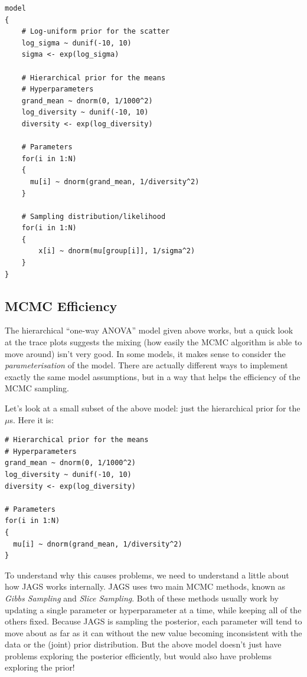 \begin{verbatim}
model
{
    # Log-uniform prior for the scatter
    log_sigma ~ dunif(-10, 10)
    sigma <- exp(log_sigma)

    # Hierarchical prior for the means
    # Hyperparameters
    grand_mean ~ dnorm(0, 1/1000^2)
    log_diversity ~ dunif(-10, 10)
    diversity <- exp(log_diversity)

    # Parameters
    for(i in 1:N)
    {
      mu[i] ~ dnorm(grand_mean, 1/diversity^2)
    }

    # Sampling distribution/likelihood
    for(i in 1:N)
    {
        x[i] ~ dnorm(mu[group[i]], 1/sigma^2)
    }
}
\end{verbatim}


\subsection{MCMC Efficiency}
The hierarchical ``one-way ANOVA'' model given above works, but a quick look
at the trace plots suggests the mixing (how easily the MCMC algorithm is
able to move around) isn't very good. In some models, it makes sense to
consider the {\it parameterisation} of the model. There are actually different
ways to implement exactly the same model assumptions, but in a way that helps
the efficiency of the MCMC sampling.

Let's look at a small subset of the above model: just the hierarchical prior
for the $\mu$s. Here it is:

\begin{verbatim}
# Hierarchical prior for the means
# Hyperparameters
grand_mean ~ dnorm(0, 1/1000^2)
log_diversity ~ dunif(-10, 10)
diversity <- exp(log_diversity)

# Parameters
for(i in 1:N)
{
  mu[i] ~ dnorm(grand_mean, 1/diversity^2)
}
\end{verbatim}

To understand why this causes problems, we need to understand a little about
how JAGS works internally. JAGS uses two main MCMC methods, known as
{\it Gibbs Sampling} and {\it Slice Sampling}. Both of these methods usually
work by updating a single parameter or hyperparameter at a time, while keeping
all of the others fixed. Because JAGS is sampling the posterior, each
parameter will tend to move about as far as it can without the new value
becoming inconsistent with the data or the (joint) prior distribution. But
the above model doesn't just have problems exploring the posterior efficiently,
but would also have problems exploring the prior!

